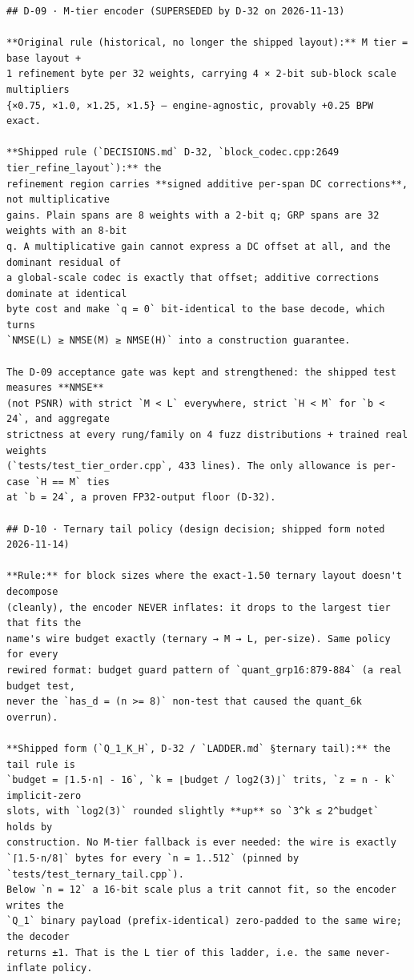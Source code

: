 \begin{verbatim}
## D-09 · M-tier encoder (SUPERSEDED by D-32 on 2026-11-13)

**Original rule (historical, no longer the shipped layout):** M tier = base layout +
1 refinement byte per 32 weights, carrying 4 × 2-bit sub-block scale multipliers
{×0.75, ×1.0, ×1.25, ×1.5} — engine-agnostic, provably +0.25 BPW exact.

**Shipped rule (`DECISIONS.md` D-32, `block_codec.cpp:2649 tier_refine_layout`):** the
refinement region carries **signed additive per-span DC corrections**, not multiplicative
gains. Plain spans are 8 weights with a 2-bit q; GRP spans are 32 weights with an 8-bit
q. A multiplicative gain cannot express a DC offset at all, and the dominant residual of
a global-scale codec is exactly that offset; additive corrections dominate at identical
byte cost and make `q = 0` bit-identical to the base decode, which turns
`NMSE(L) ≥ NMSE(M) ≥ NMSE(H)` into a construction guarantee.

The D-09 acceptance gate was kept and strengthened: the shipped test measures **NMSE**
(not PSNR) with strict `M < L` everywhere, strict `H < M` for `b < 24`, and aggregate
strictness at every rung/family on 4 fuzz distributions + trained real weights
(`tests/test_tier_order.cpp`, 433 lines). The only allowance is per-case `H == M` ties
at `b = 24`, a proven FP32-output floor (D-32).

## D-10 · Ternary tail policy (design decision; shipped form noted 2026-11-14)

**Rule:** for block sizes where the exact-1.50 ternary layout doesn't decompose
(cleanly), the encoder NEVER inflates: it drops to the largest tier that fits the
name's wire budget exactly (ternary → M → L, per-size). Same policy for every
rewired format: budget guard pattern of `quant_grp16:879-884` (a real budget test,
never the `has_d = (n >= 8)` non-test that caused the quant_6k overrun).

**Shipped form (`Q_1_K_H`, D-32 / `LADDER.md` §ternary tail):** the tail rule is
`budget = ⌈1.5·n⌉ - 16`, `k = ⌊budget / log2(3)⌋` trits, `z = n - k` implicit-zero
slots, with `log2(3)` rounded slightly **up** so `3^k ≤ 2^budget` holds by
construction. No M-tier fallback is ever needed: the wire is exactly
`⌈1.5·n/8⌉` bytes for every `n = 1..512` (pinned by `tests/test_ternary_tail.cpp`).
Below `n = 12` a 16-bit scale plus a trit cannot fit, so the encoder writes the
`Q_1` binary payload (prefix-identical) zero-padded to the same wire; the decoder
returns ±1. That is the L tier of this ladder, i.e. the same never-inflate policy.


\end{verbatim}
